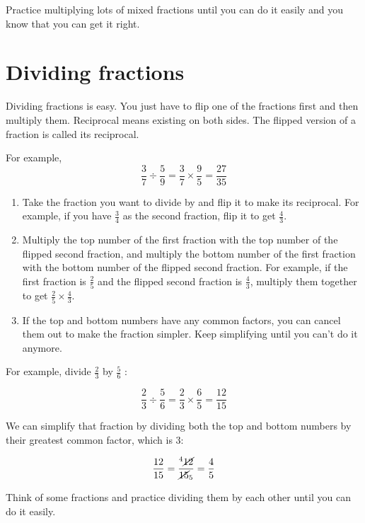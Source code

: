 \documentclass[16pt]{article}
\begin{document}
\begin{spacing}{1.25}
\vspace{28pt}
Practice multiplying lots of mixed fractions until you can do it easily and you know that you can get it right.

\pagebreak

\section{Dividing fractions}
Dividing fractions is easy. You just have to flip one of the fractions first and then multiply them. Reciprocal means existing on both sides. The flipped version of a fraction is called its reciprocal. 

For example,
$$\frac{3}{7} \div \frac{5}{9} = \frac{3}{7} \times \frac{9}{5} = \frac{27}{35}$$

\begin{enumerate}
  \item Take the fraction you want to divide by and flip it to make its reciprocal. For example, if you have $\frac{3}{4}$ as the second fraction, flip it to get $\frac{4}{3}$.
  
  \item Multiply the top number of the first fraction with the top number of the flipped second fraction, and multiply the bottom number of the first fraction with the bottom number of the flipped second fraction. For example, if the first fraction is $\frac{2}{5}$ and the flipped second fraction is $\frac{4}{3}$, multiply them together to get $\frac{2}{5} \times \frac{4}{3}$.
  
  \item If the top and bottom numbers have any common factors, you can cancel them out to make the fraction simpler. Keep simplifying until you can't do it anymore.
\end{enumerate}

For example, divide $\frac{2}{3}$ by $\frac{5}{6}$ :

$$\frac{2}{3} \div \frac{5}{6} = \frac{2}{3} \times \frac{6}{5} = \frac{12}{15}$$

We can simplify that fraction by dividing both the top and bottom numbers by their greatest common factor, which is 3:

$$\frac{12}{15} = \frac{^4\cancel{12}}{\cancel{15}_5} = \frac{4}{5}$$

\vspace{28pt}
Think of some fractions and practice dividing them by each other until you can do it easily.

\pagebreak


\end{spacing}
\end{document}
